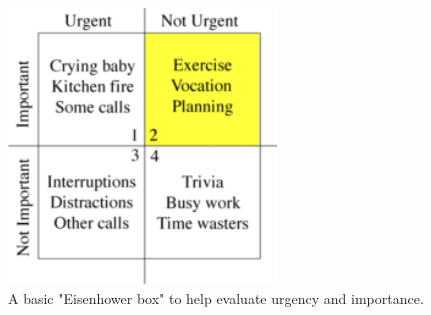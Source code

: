 \documentclass[conference]{IEEEtran}
\begin{document}
\begin{figure}[hb]
  \centering
  \includegraphics[width=2.8in]{eisenhower}
  \caption[]
   {A basic "Eisenhower box" to help evaluate urgency and importance.}
\end{figure}
\end{document}
